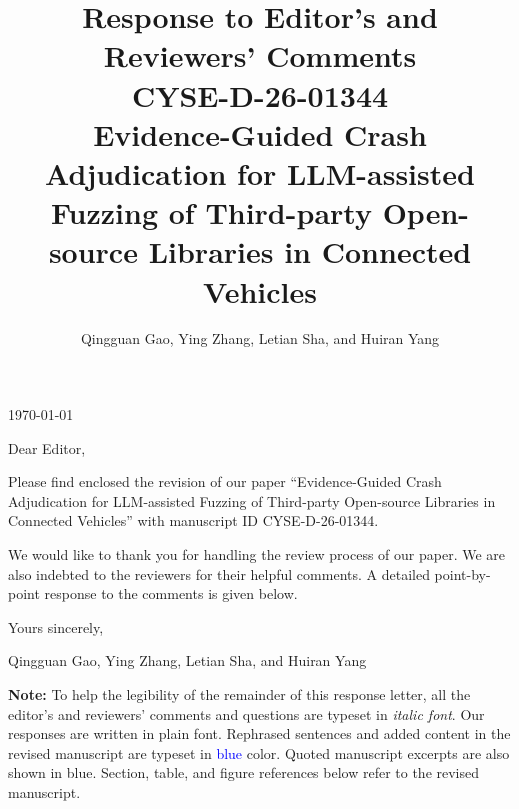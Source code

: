 \documentclass[onecolumn,11pt]{article}
\begin{document}
\title{
    {\bfseries Response to Editor's and Reviewers' Comments\\CYSE-D-26-01344}\\\vspace*{2cm}
    {\Large Evidence-Guided Crash Adjudication for LLM-assisted Fuzzing of Third-party Open-source Libraries in Connected Vehicles}\\\vspace*{2cm}
    \vspace*{1cm}
}

\author{Qingguan Gao, Ying Zhang, Letian Sha, and Huiran Yang\vspace*{1cm}}

\maketitle
\thispagestyle{empty}
\newpage
\setlength{\parskip}{2ex plus0.5ex minus0.2ex}

\thispagestyle{empty}
\vspace{-10mm}

\noindent\hfill \today\par\vspace{2\baselineskip}

\noindent Dear Editor,

\noindent Please find enclosed the revision of our paper ``Evidence-Guided Crash Adjudication for LLM-assisted Fuzzing of Third-party Open-source Libraries in Connected Vehicles'' with manuscript ID CYSE-D-26-01344.

\noindent We would like to thank you for handling the review process of our paper. We are also indebted to the reviewers for their helpful comments. A detailed point-by-point response to the comments is given below.

\noindent Yours sincerely,

\noindent Qingguan Gao, Ying Zhang, Letian Sha, and Huiran Yang\vspace{5mm}

\noindent \textbf{Note:} To help the legibility of the remainder of this response letter, all the editor's and reviewers' comments and questions are typeset in \emph{italic font}. Our responses are written in plain font. Rephrased sentences and added content in the revised manuscript are typeset in \textcolor{blue}{blue} color. Quoted manuscript excerpts are also shown in blue. Section, table, and figure references below refer to the revised manuscript.

\clearpage
\end{document}
